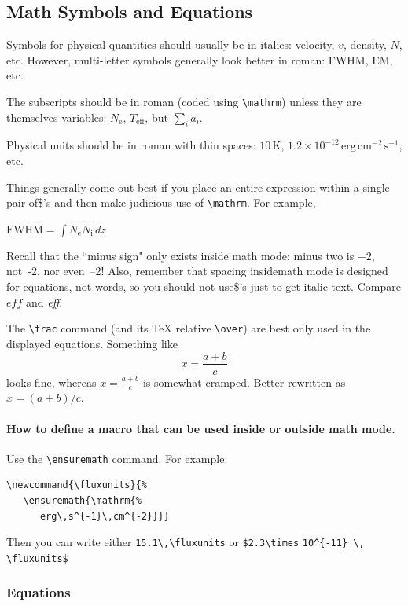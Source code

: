 \documentclass[11pt,proc,twoside]{RMxAC_rho-class/RMxAC_rho}
\newcommand{\CS}[1]{\texttt{\textbackslash #1}}
\newenvironment{Example}
{\begin{list}{}{\setlength{\leftmargin}{10pt}\setlength{\rightmargin}{10pt}}%
  \item[]\itshape}
  {\end{list}}
\begin{document}
\subsection{Math Symbols and Equations}
\label{sec:math}

Symbols for physical quantities should usually be in italics: velocity,
$v$, density, $N$, etc. However, multi-letter symbols generally look
better in roman: FWHM, EM, etc. 

The subscripts should be in roman (coded using \CS{mathrm}) unless they are themselves variables:
$N_\mathrm{e}$, $T_\mathrm{eff}$, but $\sum_i a_i$. 

Physical units should be in roman with thin spaces: $10\,\mathrm{K}$, $1.2\times
10^{-12} \,\mathrm{erg\,cm^{-2}\,s^{-1}}$, etc. 

Things generally come
out best if you place an entire expression within a single pair of\$'s and then make judicious use of \CS{mathrm}. For example,
\begin{Example}
  $ \mathrm{FWHM} = \int N_\mathrm{e} N_\mathrm{i} \, dz $ 
\end{Example}

Recall that the ``minus sign" only exists inside math mode: minus two is $-2$, not~-2, nor \hbox{even --2!} Also, remember that spacing insidemath mode is designed for equations, not words, so you should not use\$'s just to get italic text. Compare $eff$ and \textit{eff}. 

The \CS{frac} command (and its \TeX{} relative \CS{over}) are best only used in the displayed equations. Something like 
\begin{equation}
  \label{eq:one}
  x = \frac { a + b } { c } 
\end{equation}
looks fine, whereas $x = \frac { a + b } { c }$ is somewhat cramped. Better rewritten as $x = (a + b) / c $. 

\paragraph{How to define a macro that can be used inside or outside  math mode.} Use the \CS{ensuremath} command. For example: 
\begin{verbatim}
\newcommand{\fluxunits}{%
   \ensuremath{\mathrm{%
      erg\,s^{-1}\,cm^{-2}}}}
\end{verbatim}
Then you can write either \verb+15.1\,\fluxunits+ or
\verb+$2.3\times+ \verb+10^{-11} \,+ \verb+\fluxunits$+

\subsubsection{Equations}
\end{document}
